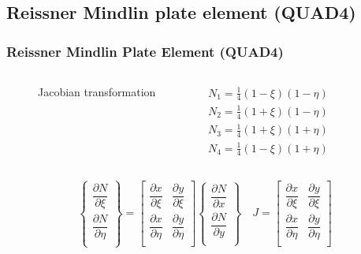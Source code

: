 \documentclass[9pt]{beamer}
\begin{document}
\subsection{Reissner Mindlin plate element (QUAD4)}
\begin{frame}\frametitle{Reissner Mindlin Plate Element (QUAD4)}

\begin{columns}
\begin{figure}[h!]
\centering


\caption{Jacobian transformation} 
\label{fig:JacTrans_quad}
\end{figure}




 
\begin{equation*}\label{eq:MITC4_SF}
\begin{split}
N_1  =\frac{1}{4}(1-\xi)(1 -\eta)
\\
N_2=\frac{1}{4}(1+\xi)(1-\eta) 
 \\
N_3  =\frac{1}{4}(1+\xi)(1+ \eta)
 \\
N_4 =\frac{1}{4}(1-\xi)(1+\eta)\end{split}
\end{equation*}
\end{columns}

\begin{equation}
\left\{
\begin{array}{r}
\dfrac{\partial N }{ \partial \xi }  \\
\dfrac{\partial N }{ \partial \eta }  \\
\end{array}
\right\}
=
\begin{bmatrix}
\dfrac{ \partial x }{\partial \xi }   &
\dfrac{ \partial y }{\partial \xi } \\
\dfrac{ \partial x }{\partial \eta }   &
\dfrac{ \partial y }{\partial \eta } \\
\end{bmatrix}
\left\{
\begin{array}{r}
\dfrac{\partial N }{ \partial x }  \\
\dfrac{\partial N }{ \partial y }  \\
\end{array}
\right\}
\quad
J=\begin{bmatrix}
\dfrac{ \partial x }{\partial \xi }   &
\dfrac{ \partial y }{\partial \xi } \\
\dfrac{ \partial x }{\partial \eta }   &
\dfrac{ \partial y }{\partial \eta } \\
\end{bmatrix}
\end{equation}



\end{frame}
\end{document}
